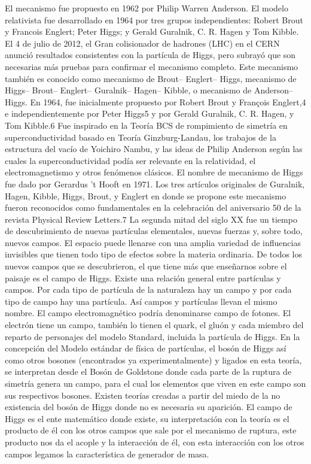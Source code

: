 \documentclass[a4paper,12pt,twoside]{book}
\begin{document}
El mecanismo fue propuesto en 1962 por Philip Warren Anderson. El modelo relativista fue desarrollado en 1964 por tres grupos independientes: Robert Brout y Francois Englert; Peter Higgs; y Gerald Guralnik, C. R. Hagen y Tom Kibble. El 4 de julio de 2012, el Gran colisionador de hadrones (LHC) en el CERN anunció resultados consistentes con la partícula de Higgs, pero subrayó que son necesarias más pruebas para confirmar el mecanismo completo.
Este mecanismo también es conocido como mecanismo de Brout– Englert– Higgs, mecanismo de Higgs– Brout– Englert– Guralnik– Hagen– Kibble, o mecanismo de Anderson– Higgs. En 1964, fue inicialmente propuesto por Robert Brout y François Englert,4 e independientemente por Peter Higgs5 y por Gerald Guralnik, C. R. Hagen, y Tom Kibble.6 Fue inspirado en la Teoría BCS de rompimiento de simetría en superconductividad basado en Teoría Ginzburg-Landau, los trabajos de la estructura del vacío de Yoichiro Nambu, y las ideas de Philip Anderson según las cuales la superconductividad podía ser relevante en la relatividad, el electromagnetismo y otros fenómenos clásicos. El nombre de mecanismo de Higgs fue dado por Gerardus 't Hooft en 1971. Los tres artículos originales de Guralnik, Hagen, Kibble, Higgs, Brout, y Englert en donde se propone este mecanismo fueron reconocidos como fundamentales en la celebración del aniversario 50 de la revista Physical Review Letters.7
La segunda mitad del siglo XX fue un tiempo de descubrimiento de nuevas partículas elementales, nuevas fuerzas y, sobre todo, nuevos campos. El espacio puede llenarse con una amplia variedad de influencias invisibles que tienen todo tipo de efectos sobre la materia ordinaria. De todos los nuevos campos que se descubrieron, el que tiene más que enseñarnos sobre el paisaje es el campo de Higgs. Existe una relación general entre partículas y campos. Por cada tipo de partícula de la naturaleza hay un campo y por cada tipo de campo hay una partícula. Así campos y partículas llevan el mismo nombre. El campo electromagnético podría denominarse campo de fotones. El electrón tiene un campo, también lo tienen el quark, el gluón y cada miembro del reparto de personajes del modelo Standard, incluida la partícula de Higgs.
En la concepción del Modelo estándar de física de partículas, el bosón de Higgs así como otros bosones (encontrados ya experimentalmente) y ligados en esta teoría, se interpretan desde el Bosón de Goldstone donde cada parte de la ruptura de simetría genera un campo, para el cual los elementos que viven en este campo son sus respectivos bosones. Existen teorías creadas a partir del miedo de la no existencia del bosón de Higgs donde no es necesaria su aparición. El campo de Higgs es el ente matemático donde existe, su interpretación con la teoría es el producto de él con los otros campos que sale por el mecanismo de ruptura, este producto nos da el acople y la interacción de él, con esta interacción con los otros campos legamos la característica de generador de masa.
\end{document}
